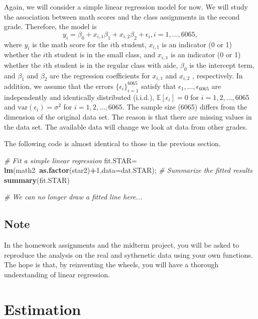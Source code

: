 \documentclass[12pt,]{book}
\newenvironment{Shaded}{\begin{snugshade}}{\end{snugshade}}
\newcommand{\KeywordTok}[1]{\textcolor[rgb]{0.13,0.29,0.53}{\textbf{#1}}}
\newcommand{\DataTypeTok}[1]{\textcolor[rgb]{0.13,0.29,0.53}{#1}}
\newcommand{\DecValTok}[1]{\textcolor[rgb]{0.00,0.00,0.81}{#1}}
\newcommand{\StringTok}[1]{\textcolor[rgb]{0.31,0.60,0.02}{#1}}
\newcommand{\CommentTok}[1]{\textcolor[rgb]{0.56,0.35,0.01}{\textit{#1}}}
\newcommand{\OperatorTok}[1]{\textcolor[rgb]{0.81,0.36,0.00}{\textbf{#1}}}
\newcommand{\NormalTok}[1]{#1}
\begin{document}
Again, we will consider a simple linear regression model for now. We
will study the association between math scores and the class assignments
in the second grade. Therefore, the model is \[
    y_i =\beta_0 + x_{i,1} \beta_1  +x_{i,2} \beta_2  +  \epsilon_i, i=1,\ldots, 6065,
    \] where \(y_i\) is the math score for the \(i\)th student,
\(x_{i,1}\) is an indicator (0 or 1) whether the \(i\)th student is in
the small class, and \(x_{i,1}\) is an indicator (0 or 1) whether the
\(i\)th student is in the regular class with aide, \(\beta_0\) is the
intercept term, and \(\beta_1\) and \(\beta_2\) are the regression
coefficients for \(x_{i,1}\) and \(x_{i,2}\) , respectively. In
addition, we assume that the errors \(\{\epsilon_i\}_{i=1}^{6065}\)
satisfy that \(\epsilon_1,\ldots, \epsilon_{6065}\) are independently
and identically distributed (i.i.d.), \(\mathbb{E}[\epsilon_i]= 0\) for
\(i=1,2,\ldots, 6065\) and \(\mathrm{var}(\epsilon_i)=\sigma^2\) for
\(i=1,2,\ldots, 6065\). The sample size (6065) differs from the
dimension of the original data set. The reason is that there are missing
values in the data set. The available data will change we look at data
from other grades.

The following code is almost identical to those in the previous section.

\begin{Shaded}
\begin{Highlighting}[]
\CommentTok{# Fit a simple linear regression}
\NormalTok{fit.STAR=}\StringTok{ }\KeywordTok{lm}\NormalTok{(math2}\OperatorTok{~}\KeywordTok{as.factor}\NormalTok{(star2)}\OperatorTok{+}\DecValTok{1}\NormalTok{,}\DataTypeTok{data=}\NormalTok{dat.STAR); }
\CommentTok{# Summarize the fitted results}
\KeywordTok{summary}\NormalTok{(fit.STAR) }

\CommentTok{# We can no longer draw a fitted line here...}
\end{Highlighting}
\end{Shaded}

\section{Note}\label{note}

In the homework assignments and the midterm project, you will be asked
to reproduce the analysis on the real and sythenetic data using your own
functions. The hope is that, by reinventing the wheels, you will have a
thorough understanding of linear regression.

\chapter{Estimation}\label{ch:est}
\end{document}
